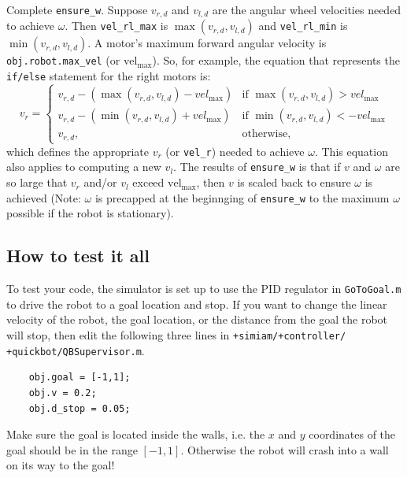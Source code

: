 \documentclass[10pt]{article}
\begin{document}
\begin{enumerate}
  Complete \texttt{ensure\_w}. Suppose $v_{r,d}$ and $v_{l,d}$ are the angular wheel velocities needed to achieve $\omega$. Then \texttt{vel\_rl\_max} is $\max(v_{r,d},v_{l,d})$ and \texttt{vel\_rl\_min} is $\min(v_{r,d},v_{l,d})$. A motor's maximum forward angular velocity is \texttt{obj.robot.max\_vel} (or $\text{vel}_{\max}$). So, for example, the equation that represents the \texttt{if/else} statement for the right motors is:
  \begin{equation*}
    v_r= 
\begin{cases}
    v_{r,d} - (\max(v_{r,d},v_{l,d})-vel_{\max})& \text{if } \max(v_{r,d},v_{l,d}) > vel_{\max}\\
    v_{r,d} - (\min(v_{r,d},v_{l,d})+vel_{\max})& \text{if } \min(v_{r,d},v_{l,d}) < -vel_{\max}\\
    v_{r,d},              & \text{otherwise},
\end{cases}
  \end{equation*}
  which defines the appropriate $v_r$ (or \texttt{vel\_r}) needed to achieve $\omega$. This equation also applies to computing a new $v_l$. The results of \texttt{ensure\_w} is that if $v$ and $\omega$ are so large that $v_r$ and/or $v_l$ exceed $\text{vel}_{\max}$, then $v$ is scaled back to ensure $\omega$ is achieved (Note: $\omega$ is precapped at the beginnging of \texttt{ensure\_w} to the maximum $\omega$ possible if the robot is stationary).
  
\end{enumerate}

\subsection*{How to test it all}

To test your code, the simulator is set up to use the PID regulator in \texttt{GoToGoal.m} to drive the robot to a goal location and stop. If you want to change the linear velocity of the robot, the goal location, or the distance from the goal the robot will stop, then edit the following three lines in \texttt{+simiam/+controller/} \texttt{+quickbot/QBSupervisor.m}.
  \begin{verbatim}
    obj.goal = [-1,1];
    obj.v = 0.2;
    obj.d_stop = 0.05;\end{verbatim}
Make sure the goal is located inside the walls, i.e. the $x$ and $y$ coordinates of the goal should be in the range $[-1,1]$. Otherwise the robot will crash into a wall on its way to the goal!
\end{document}

